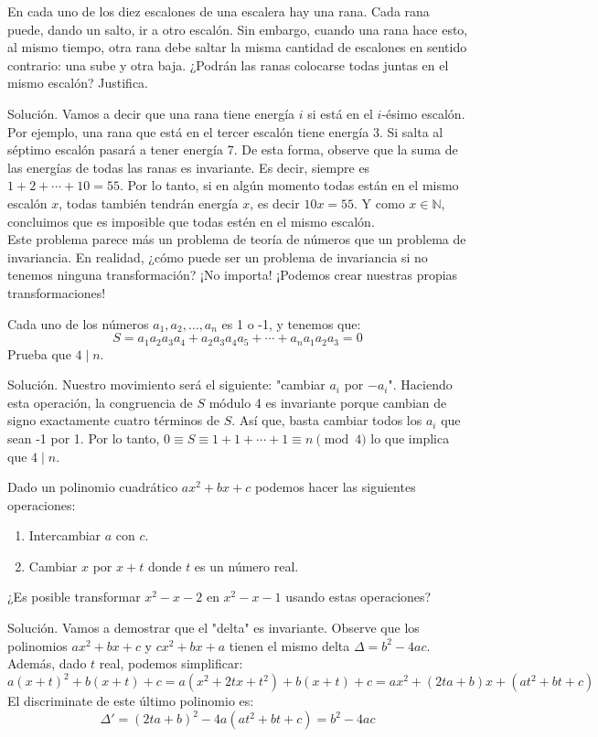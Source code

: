 \documentclass[11pt]{scrartcl}
\begin{document}
\begin{example}
En cada uno de los diez escalones de una escalera hay una rana. Cada rana puede, dando un salto, ir a otro escalón. Sin embargo, cuando una rana hace esto, al mismo tiempo, otra rana debe saltar la misma cantidad de escalones en sentido contrario: una sube y otra baja. ¿Podrán las ranas colocarse todas juntas en el mismo escalón? Justifica.
\end{example}
Solución. Vamos a decir que una rana tiene energía \( i \) si está en el \( i \)-ésimo escalón. Por ejemplo, una rana que está en el tercer escalón tiene energía 3. Si salta al séptimo escalón pasará a tener energía 7. De esta forma, observe que la suma de las energías de todas las ranas es invariante. Es decir, siempre es \( 1 + 2 + \cdots + 10 = 55 \). Por lo tanto, si en algún momento todas están en el mismo escalón \( x \), todas también tendrán energía \( x \), es decir \( 10x = 55 \). Y como \( x \in \mathbb{N} \), concluimos que es imposible que todas estén en el mismo escalón.\\

Este problema parece más un problema de teoría de números que un problema de invariancia. En realidad, ¿cómo puede ser un problema de invariancia si no tenemos ninguna transformación? ¡No importa! ¡Podemos crear nuestras propias transformaciones!

\begin{example}
    Cada uno de los números \( a_1, a_2, \ldots, a_n \) es 1 o -1, y tenemos que:
\[
S = a_1a_2a_3a_4 + a_2a_3a_4a_5 + \cdots + a_n a_1 a_2 a_3 = 0
\]
Prueba que \( 4 \mid n \).
\end{example}

Solución. Nuestro movimiento será el siguiente: "cambiar \( a_i \) por \( -a_i \)". Haciendo esta operación, la congruencia de \( S \) módulo 4 es invariante porque cambian de signo exactamente cuatro términos de \( S \). Así que, basta cambiar todos los \( a_i \) que sean -1 por 1. Por lo tanto, \( 0 \equiv S \equiv 1+1+\cdots+1 \equiv n \pmod{4} \) lo que implica que \( 4 \mid n \).

\begin{example}
    Dado un polinomio cuadrático \( ax^2 + bx + c \) podemos hacer las siguientes operaciones:
\begin{enumerate}
    \item Intercambiar \( a \) con \( c \).
    \item Cambiar \( x \) por \( x + t \) donde \( t \) es un número real.
\end{enumerate}

¿Es posible transformar \( x^2 - x - 2 \) en \( x^2 - x - 1 \) usando estas operaciones?
\end{example}
Solución. Vamos a demostrar que el "delta" es invariante. Observe que los polinomios \( ax^2 + bx + c \) y \( cx^2 + bx + a \) tienen el mismo delta \( \Delta = b^2 - 4ac \). Además, dado \( t \) real, podemos simplificar:
\[
a(x + t)^2 + b(x + t) + c = a(x^2 + 2tx + t^2) + b(x + t) + c = ax^2 + (2ta + b)x + (at^2 + bt + c)
\]
El discriminate de este último polinomio es:
\[
\Delta' = (2ta + b)^2 - 4a(at^2 + bt + c) = b^2 - 4ac
\]
\end{document}
